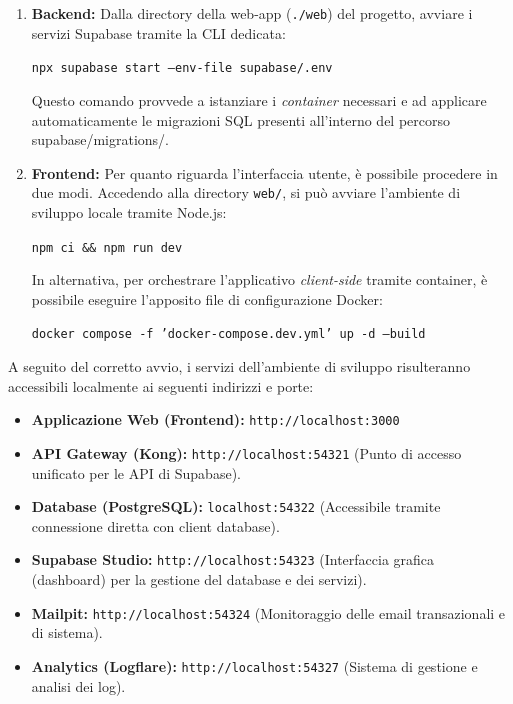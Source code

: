 \documentclass[12pt,a4paper]{report}
\begin{document}
\begin{enumerate}
  \item \textbf{Backend:} Dalla directory della web-app
    (\texttt{./web}) del progetto, avviare i servizi Supabase tramite
    la CLI dedicata:
    \begin{center}
      \texttt{npx supabase start --env-file supabase/.env}
    \end{center}
    Questo comando provvede a istanziare i \textit{container}
    necessari e ad applicare automaticamente le migrazioni SQL
    presenti all'interno del percorso supabase/migrations/.

  \item \textbf{Frontend:} Per quanto riguarda l'interfaccia utente,
    è possibile procedere in due modi. Accedendo alla directory
    \texttt{web/}, si può avviare l'ambiente di sviluppo locale tramite Node.js:
    \begin{center}
      \texttt{npm ci \&\& npm run dev}
    \end{center}
    In alternativa, per orchestrare l'applicativo
    \textit{client-side} tramite container, è possibile eseguire
    l'apposito file di configurazione Docker:
    \begin{center}
      \texttt{docker compose -f 'docker-compose.dev.yml'
      up -d --build}
    \end{center}
\end{enumerate}

\noindent A seguito del corretto avvio, i servizi dell'ambiente di
sviluppo risulteranno accessibili localmente ai seguenti indirizzi e porte:
\begin{itemize}
  \item \textbf{Applicazione Web (Frontend):} \texttt{http://localhost:3000}
  \item \textbf{API Gateway (Kong):} \texttt{http://localhost:54321}
    (Punto di accesso unificato per le API di Supabase).
  \item \textbf{Database (PostgreSQL):} \texttt{localhost:54322}
    (Accessibile tramite connessione diretta con client database).
  \item \textbf{Supabase Studio:} \texttt{http://localhost:54323}
    (Interfaccia grafica (dashboard) per la gestione del database e
    dei servizi).
  \item \textbf{Mailpit:} \texttt{http://localhost:54324}
    (Monitoraggio delle email transazionali e di sistema).
  \item \textbf{Analytics (Logflare):}
    \texttt{http://localhost:54327} (Sistema di gestione e analisi dei log).
\end{itemize}
\end{document}
